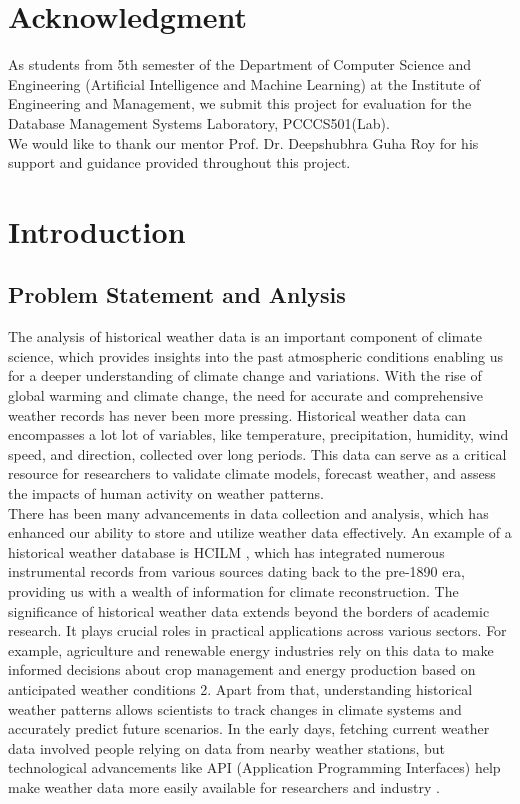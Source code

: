 \documentclass[12pt, a4paper]{article}
\begin{document}
\section*{Acknowledgment}
As students from 5th semester of the Department of Computer Science and Engineering (Artificial Intelligence and Machine Learning) at the Institute of Engineering and Management, we submit this project for evaluation for the Database Management Systems Laboratory, PCCCS501(Lab). \\
We would like to thank our mentor Prof. Dr. Deepshubhra Guha Roy for his support and guidance provided throughout this project.
\newpage


\tableofcontents
\newpage
\section{Introduction}
\subsection{Problem Statement and Anlysis}
The analysis of historical weather data is an important component of climate science, which provides insights into the past atmospheric conditions enabling us for a deeper understanding of climate change and variations. With the rise of global warming and climate change, the need for accurate and comprehensive weather records has never been more pressing. Historical weather data can encompasses a lot lot of variables, like temperature, precipitation, humidity, wind speed, and direction, collected over long periods. This data can serve as a critical resource for researchers to validate climate models, forecast weather, and assess the impacts of human activity on weather patterns.\\
There has been many advancements in data collection and analysis, which has enhanced our ability to store and utilize weather data effectively. An example of a historical weather database is HCILM \cite{Lundstad2023-ky}, which has integrated numerous instrumental records from various sources dating back to the pre-1890 era, providing us with a wealth of information for climate reconstruction. 
The significance of historical weather data extends beyond the borders of academic research. It plays crucial roles in practical applications across various sectors. For example, agriculture and renewable energy industries rely on this data to make informed decisions about crop management and energy production based on anticipated weather conditions 2. Apart from that, understanding historical weather patterns allows scientists to track changes in climate systems and accurately 
predict future scenarios. In the early days, fetching current weather data involved people relying on data from nearby weather stations, but technological advancements like API (Application Programming Interfaces) help make weather data more easily available for researchers and industry \cite{weatherstackLeveragingHistorical}. 
\end{document}
